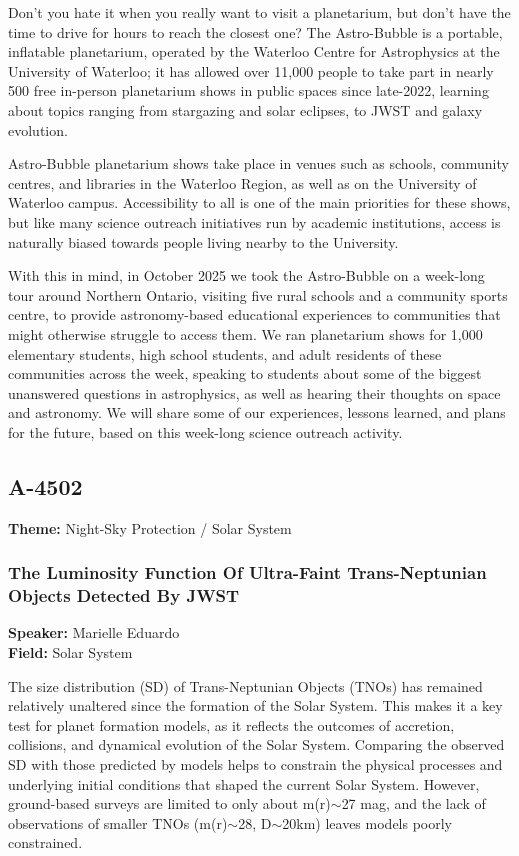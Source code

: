 Don't you hate it when you really want to visit a planetarium, but don't have the time to drive for hours to reach the closest one? The Astro-Bubble is a portable, inflatable planetarium, operated by the Waterloo Centre for Astrophysics at the University of Waterloo; it has allowed over 11,000 people to take part in nearly 500 free in-person planetarium shows in public spaces since late-2022, learning about topics ranging from stargazing and solar eclipses, to JWST and galaxy evolution.

Astro-Bubble planetarium shows take place in venues such as schools, community centres, and libraries in the Waterloo Region, as well as on the University of Waterloo campus. Accessibility to all is one of the main priorities for these shows, but like many science outreach initiatives run by academic institutions, access is naturally biased towards people living nearby to the University.

With this in mind, in October 2025 we took the Astro-Bubble on a week-long tour around Northern Ontario, visiting five rural schools and a community sports centre, to provide astronomy-based educational experiences to communities that might otherwise struggle to access them. We ran planetarium shows for 1,000 elementary students, high school students, and adult residents of these communities across the week, speaking to students about some of the biggest unanswered questions in astrophysics, as well as hearing their thoughts on space and astronomy. We will share some of our experiences, lessons learned, and plans for the future, based on this week-long science outreach activity.

\subsection*{A-4502}
\textbf{Theme:} Night-Sky Protection / Solar System

\hypertarget{abstract-talk-319}{}\label{abstract-page-talk-319}
\subsubsection*{The Luminosity Function Of Ultra-Faint Trans-Neptunian Objects Detected By JWST}
\textbf{Speaker:} Marielle Eduardo\\
\textbf{Field:} Solar System

The size distribution (SD) of Trans-Neptunian Objects (TNOs) has remained relatively unaltered since the formation of the Solar System. This makes it a key test for planet formation models, as it reflects the outcomes of accretion, collisions, and dynamical evolution of the Solar System. Comparing the observed SD with those predicted by models helps to constrain the physical processes and underlying initial conditions that shaped the current Solar System. However, ground-based surveys are limited to only about m(r)$\sim$27 mag, and the lack of observations of smaller TNOs (m(r)$\sim$28, D$\sim$20km) leaves models poorly constrained.

